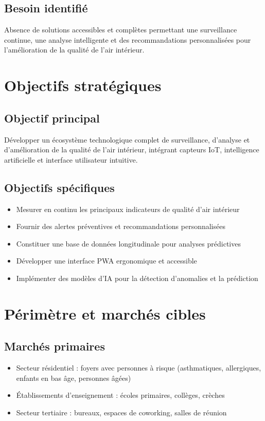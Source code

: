 \documentclass[12pt,a4paper]{article}
\begin{document}
\subsection{Besoin identifié}
Absence de solutions accessibles et complètes permettant une surveillance continue, une analyse intelligente et des recommandations personnalisées pour l'amélioration de la qualité de l'air intérieur.

\section{Objectifs stratégiques}
\subsection{Objectif principal}
Développer un écosystème technologique complet de surveillance, d'analyse et d'amélioration de la qualité de l'air intérieur, intégrant capteurs IoT, intelligence artificielle et interface utilisateur intuitive.

\subsection{Objectifs spécifiques}
\begin{itemize}
    \item Mesurer en continu les principaux indicateurs de qualité d'air intérieur
    \item Fournir des alertes préventives et recommandations personnalisées
    \item Constituer une base de données longitudinale pour analyses prédictives
    \item Développer une interface PWA ergonomique et accessible
    \item Implémenter des modèles d'IA pour la détection d'anomalies et la prédiction
\end{itemize}

\section{Périmètre et marchés cibles}
\subsection{Marchés primaires}
\begin{itemize}
    \item Secteur résidentiel : foyers avec personnes à risque (asthmatiques, allergiques, enfants en bas âge, personnes âgées)
    \item Établissements d'enseignement : écoles primaires, collèges, crèches
    \item Secteur tertiaire : bureaux, espaces de coworking, salles de réunion
\end{itemize}
\end{document}
